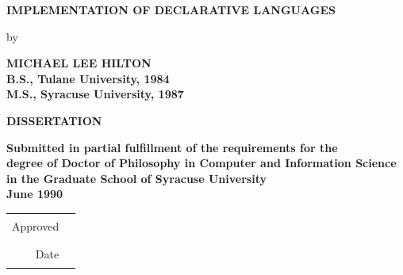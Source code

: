 \clearpage
\thispagestyle{empty}
\begin{center}
\vspace*{1.3in}

\textbf{IMPLEMENTATION OF DECLARATIVE LANGUAGES}

\vspace{1.2in}

by

\vspace{0.25in}

\textbf{MICHAEL LEE HILTON}\\
\textbf{B.S., Tulane University, 1984}\\
\textbf{M.S., Syracuse University, 1987}

\vspace{1.3in}

\textbf{DISSERTATION}

\vspace{0.35in}

\textbf{Submitted in partial fulfillment of the requirements for the}\\
\textbf{degree of Doctor of Philosophy in Computer and Information Science}\\
\textbf{in the Graduate School of Syracuse University}\\
\textbf{June 1990}

\vfill

\begin{tabular}{@{}rl@{}}
Approved & \rule{2.6in}{0.4pt}\\[0.6em]
Date & \rule{2.6in}{0.4pt}
\end{tabular}

\vspace{0.7in}
\end{center}
